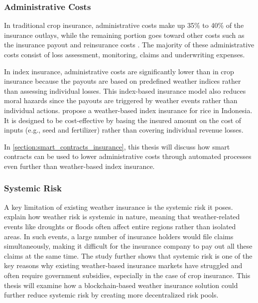 \subsubsection{Administrative Costs}
In traditional crop insurance, administrative costs make up 35\% to 40\% of the insurance outlays, while the remaining portion goes toward other costs such as the insurance payout and reinsurance costs \autocite{glauber2004crop}. The majority of these administrative costs consist of loss assessment, monitoring, claims and underwriting expenses.
 
In index insurance, administrative costs are significantly lower than in crop insurance because the payouts are based on predefined weather indices rather than assessing individual losses. This index-based insurance model also reduces moral hazards since the payouts are triggered by weather events rather than individual actions. \textcite{kusuma2018viable} propose a weather-based index insurance for rice in Indonesia. It is designed to be cost-effective by basing the insured amount on the cost of inputs (e.g., seed and fertilizer) rather than covering individual revenue losses.
 
In \cref{section:smart_contracts_insurance}, this thesis will discuss how smart contracts can be used to lower administrative costs through automated processes even further than weather-based index insurance.
 
\subsubsection{Systemic Risk}\label{systemic_risk}
A key limitation of existing weather insurance is the systemic risk it poses. \textcite{xu2010systemic} explain how weather risk is systemic in nature, meaning that weather-related events like droughts or floods often affect entire regions rather than isolated areas. In such events, a large number of insurance holders would file claims simultaneously, making it difficult for the insurance company to pay out all these claims at the same time. The study further shows that systemic risk is one of the key reasons why existing weather-based insurance markets have struggled and often require government subsidies, especially in the case of crop insurance. This thesis will examine how a blockchain-based weather insurance solution could further reduce systemic risk by creating more decentralized risk pools.
 
